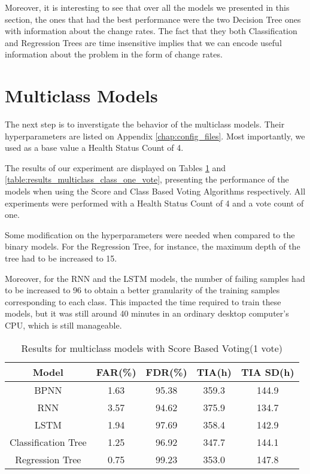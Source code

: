 Moreover, it is interesting to see that over all the models we presented in this section, the ones that had the best performance were the two Decision Tree ones with information about the change rates.
The fact that they both Classification and Regression Trees are time insensitive implies that we can encode useful information about the problem in the form of change rates. 

\section{Multiclass Models}

The next step is to inverstigate the behavior of the multiclass models.
Their hyperparameters are listed on Appendix \ref{chap:config_files}.
Most importantly, we used as a base value a Health Status Count of 4.

The results of our experiment are displayed on Tables \ref{table:results_multiclass_score_one_vote} and \ref{table:results_multiclass_class_one_vote}, presenting the performance of the models when using the Score and Class Based Voting Algorithms respectively.
All experiments were performed with a Health Status Count of 4 and a vote count of one.

Some modification on the hyperparameters were needed when compared to the binary models.
For the Regression Tree, for instance, the maximum depth of the tree had to be increased to 15.

Moreover, for the RNN and the LSTM models, the number of failing samples had to be increased to 96 to obtain a better granularity of the training samples corresponding to each class.
This impacted the time required to train these models, but it was still around 40 minutes in an ordinary desktop computer's CPU, which is still manageable.

\begin{table}
  \begin{center}
    \begin{tabular}{|c|c|c|c|c|}
      \hline
    Model & FAR(\%) & FDR(\%) & TIA(h) & TIA SD(h) \\
    \hline
    BPNN & 1.63 & 95.38 & 359.3 & 144.9 \\
    RNN & 3.57 & 94.62 & 375.9 & 134.7 \\
    LSTM & 1.94 & 97.69 & 358.4 & 142.9 \\
    Classification Tree & 1.25 & 96.92 & 347.7 & 144.1 \\
    Regression Tree & 0.75 & 99.23 & 353.0 & 147.8 \\
    \hline
    \end{tabular}
    \caption[Results Multiclass Models, Score Voting, 1 vote]{Results for multiclass models with Score Based Voting(1 vote)}
    \label{table:results_multiclass_score_one_vote}
  \end{center}
\end{table}

